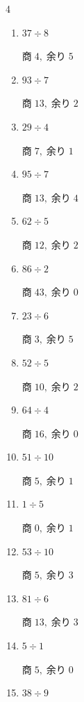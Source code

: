 \begin{multicols}{4}
\begin{enumerate}
        $商\; 1,\; 余り\; 3$

  \item $37 \div 8$

        $商\; 4,\; 余り\; 5$

  \item $93 \div 7$

        $商\; 13,\; 余り\; 2$

  \item $29 \div 4$

        $商\; 7,\; 余り\; 1$

  \item $95 \div 7$

        $商\; 13,\; 余り\; 4$

  \item $62 \div 5$

        $商\; 12,\; 余り\; 2$

  \item $86 \div 2$

        $商\; 43,\; 余り\; 0$

  \item $23 \div 6$

        $商\; 3,\; 余り\; 5$

  \item $52 \div 5$

        $商\; 10,\; 余り\; 2$

  \item $64 \div 4$

        $商\; 16,\; 余り\; 0$

\columnbreak %

  \item $51 \div 10$

        $商\; 5,\; 余り\; 1$

  \item $1 \div 5$

        $商\; 0,\; 余り\; 1$

  \item $53 \div 10$

        $商\; 5,\; 余り\; 3$

  \item $81 \div 6$

        $商\; 13,\; 余り\; 3$

  \item $5 \div 1$

        $商\; 5,\; 余り\; 0$

  \item $38 \div 9$


\end{enumerate}
\end{multicols}
